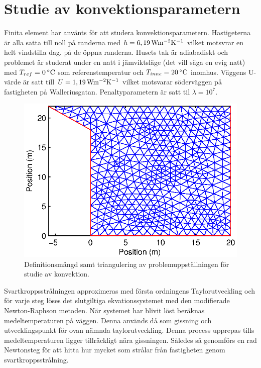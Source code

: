 \section{Studie av konvektionsparametern}

Finita element har använts för att studera konvektionsparametern. Hastigeterna är alla
satta till noll på randerna med $h=\unit[6,19]{Wm^{-2}K^{-1}}$ vilket motsvrar en helt vindstilla dag.
på de öppna randerna. Husets tak är adiabadiskt
och problemet är studerat under en natt i jämviktsläge (det vill säga en evig natt) med
$T_{ref} = \unit[0]{^\circ C}$ som referenstemperatur och $T_{inne} = \unit[20]{^\circ C}$ inomhus.
Väggens U-värde är satt till $U = \unit[1,19]{Wm^{-2}K^{-1}}$ vilket motsvarar söderväggen på fastigheten på Walleriusgatan. Penaltyparametern är satt til $\lambda = 10^7$.

\begin{figure}
\centering
\includegraphics{images/triconvec.eps}
\caption{Definitionsmängd samt triangulering av problemuppställningen för studie av konvektion.}
\end{figure}

Svartkroppsstrålningen approximeras med första ordningens Taylorutveckling och
för varje steg löses det slutgiltiga ekvationssystemet med den
modifierade Newton-Raphson metoden. När systemet har blivit löst beräknas
medeltemperaturen på väggen. Denna används då som gissning och utvecklingspunkt
för ovan nämnda taylorutveckling. Denna process upprepas tills medeltemperaturen
ligger tillräckligt nära gissningen. Således så genomförs en rad Newtonsteg
för att hitta hur mycket som strålar från fastigheten genom svartkroppsstrålning.

